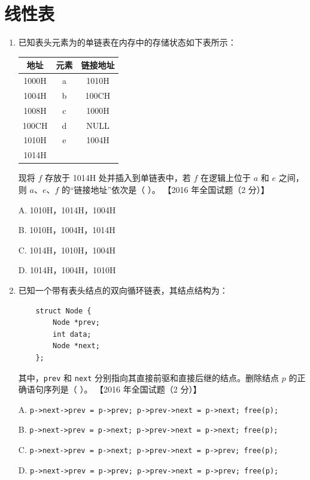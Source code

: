 \documentclass[lang=cn,newtx,10pt,scheme=chinese]{elegantbook}
\begin{document}
\chapter{线性表}
\begin{enumerate}
\item 已知表头元素为的单链表在内存中的存储状态如下表所示：
    \begin{table}[h!]
        \centering
        \begin{tabular}{|c|c|c|}
            \hline
            地址 & 元素 & 链接地址 \\ \hline
            1000H & a & 1010H \\ \hline
            1004H & b & 100CH \\ \hline
            1008H & c & 1000H \\ \hline
            100CH & d & NULL \\ \hline
            1010H & e & 1004H \\ \hline
            1014H &   &  \\ \hline
        \end{tabular}
    \end{table}

    现将 $f$ 存放于 1014H 处并插入到单链表中，若 $f$ 在逻辑上位于 $a$ 和 $e$ 之间，则 $a$、$e$、$f$ 的“链接地址”依次是（ ）。  
    【2016 年全国试题（2 分）】 

    A. 1010H，1014H，1004H  

    B. 1010H，1004H，1014H 

    C. 1014H，1010H，1004H  

    D. 1014H，1004H，1010H  

    \item 已知一个带有表头结点的双向循环链表，其结点结构为：
    \begin{verbatim}
    struct Node {
        Node *prev;
        int data;
        Node *next;
    };
    \end{verbatim}
    其中，\texttt{prev} 和 \texttt{next} 分别指向其直接前驱和直接后继的结点。删除结点 $p$ 的正确语句序列是（ ）。  
    【2016 年全国试题（2 分）】  

    A. \texttt{p->next->prev = p->prev; p->prev->next = p->next; free(p);}  

    B. \texttt{p->next->prev = p->next; p->prev->next = p->next; free(p);}  

    C. \texttt{p->next->prev = p->next; p->prev->next = p->prev; free(p);}  

    D. \texttt{p->next->prev = p->prev; p->prev->next = p->prev; free(p);}  


\end{enumerate}
\end{document}
